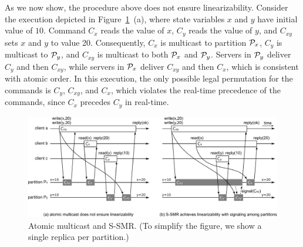 As we now show, the procedure above does not ensure linearizability.
Consider the execution depicted in Figure~\ref{fig:mcastnonlinssmr}~(a), where state variables $x$ and $y$ have initial value of $10$. 
Command $C_x$ reads the value of $x$, $C_y$ reads the value of $y$, and $C_{xy}$ sets $x$ and $y$ to value 20.
Consequently, $C_x$ is multicast to partition $\mathcal{P}_x$, $C_y$ is multicast to $\mathcal{P}_y$, and $C_{xy}$ is multicast to both $\mathcal{P}_x$ and $\mathcal{P}_y$. 
Servers in $\mathcal{P}_y$ deliver $C_y$ and then $C_{xy}$, while servers in $\mathcal{P}_x$ deliver $C_{xy}$ and then $C_x$, which is consistent with atomic order. 
In this execution, the only possible legal permutation for the commands is $C_y$, $C_{xy}$, and $C_x$, which violates the real-time precedence of the commands, since $C_x$ precedes $C_y$ in real-time.

%
\begin{figure}
\begin{minipage}[b]{1.0\linewidth} %
\centering
      \includegraphics[width=0.85\linewidth]{figures/mcastssmr_nonlin_linsignal_v3}
\end{minipage}
\caption{Atomic multicast and S-SMR. (To simplify the figure, we show a single replica per partition.)}
\label{fig:mcastnonlinssmr}
\end{figure}

